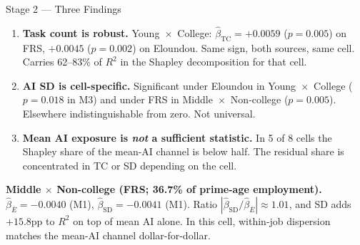 \documentclass[10pt,english,aspectratio=169]{beamer}
\begin{document}
\begin{frame}{Stage 2 --- Three Findings}
\begin{enumerate}\small
  \item \textbf{Task count is robust.} Young~$\times$~College: $\hat\beta_{\text{TC}}=+0.0059$ ($p=0.005$) on FRS, $+0.0045$ ($p=0.002$) on Eloundou. Same sign, both sources, same cell. Carries 62--83\% of $R^2$ in the Shapley decomposition for that cell.
  \item \textbf{AI SD is cell-specific.} Significant under Eloundou in Young~$\times$~College ($p=0.018$ in M3) and under FRS in Middle~$\times$~Non-college ($p=0.005$). Elsewhere indistinguishable from zero. Not universal.
  \item \textbf{Mean AI exposure is \emph{not} a sufficient statistic.} In 5 of 8 cells the Shapley share of the mean-AI channel is below half. The residual share is concentrated in TC or SD depending on the cell.
\end{enumerate}

\vspace{0.2cm}
\begin{tcolorbox}[colback=gray!5,colframe=gray!40]\scriptsize
\textbf{Middle $\times$ Non-college (FRS; 36.7\% of prime-age employment).} $\hat\beta_{\bar E} = -0.0040$ (M1), $\hat\beta_{\text{SD}} = -0.0041$ (M1). Ratio $|\hat\beta_{\text{SD}}/\hat\beta_{\bar E}| \approx 1.01$, and SD adds $+15.8$pp to $R^2$ on top of mean AI alone. In this cell, within-job dispersion matches the mean-AI channel dollar-for-dollar.
\end{tcolorbox}
\end{frame}
\end{document}
